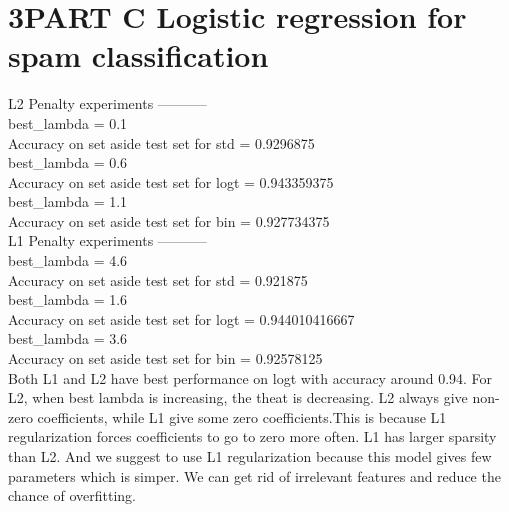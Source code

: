 \documentclass[pdftex,11pt]{article}
\begin{document}
\section{3PART C Logistic regression for spam classification}

L2 Penalty experiments -----------\\
best\_lambda =  0.1\\
Accuracy on set aside test set for  std  =  0.9296875\\

best\_lambda =  0.6\\
Accuracy on set aside test set for  logt  =  0.943359375\\

best\_lambda =  1.1\\
Accuracy on set aside test set for  bin  =  0.927734375\\


L1 Penalty experiments -----------\\
best\_lambda =  4.6\\
Accuracy on set aside test set for  std  =  0.921875\\

best\_lambda =  1.6\\
Accuracy on set aside test set for  logt  =  0.944010416667\\

best\_lambda =  3.6\\
Accuracy on set aside test set for  bin  =  0.92578125\\


Both L1 and L2 have best performance on logt with accuracy around 0.94.
For L2, when best lambda is increasing, the theat is decreasing.
L2 always give non-zero coefficients, while L1 give some zero coefficients.This is because L1 regularization forces coefficients to go to zero more often. 
L1 has larger sparsity than L2.
And we suggest to use L1 regularization because this model gives few parameters which is simper. We can get rid of irrelevant features and reduce the chance of overfitting.
\end{document}
